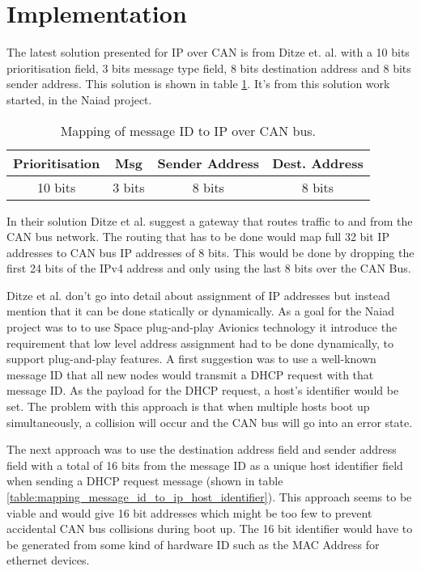 \section{Implementation}\label{sec:implementation}
The latest solution presented for IP over CAN is from Ditze et. al. with a 10
bits prioritisation field, 3 bits message type field, 8 bits destination
address and 8 bits sender address. This solution is shown in table
\ref{table:mapping_message_id_to_ip}. It's from this solution work started,
in the Naiad project.

\begin{table}[h]
\centering
    \caption{Mapping of message ID to IP over CAN bus.}
    \begin{tabular}{|c|c|c|c|} \hline
    \label{table:mapping_message_id_to_ip}
    Prioritisation & Msg & Sender Address & Dest. Address  \\ \hline
            10 bits & 3 bits & 8 bits & 8 bits \\ \hline
    \end{tabular}
\end{table}


In their solution Ditze et al. suggest a gateway that routes traffic to and from the
CAN bus network. The routing that has to be done would map full 32 bit IP
addresses to CAN bus IP addresses of 8 bits. This would be done by dropping the
first 24 bits of the IPv4 address and only using the last 8 bits over the CAN
Bus.

Ditze et al. don't go into
detail about assignment of IP addresses
but instead mention that it can be done statically or dynamically. As a goal
for the Naiad project was to to use Space plug-and-play Avionics technology
it introduce the requirement that low level address assignment had to be done
dynamically, to support plug-and-play features.
A first suggestion was to use a well-known message ID that all new
nodes would transmit a DHCP request with that message ID.
As the payload for the DHCP request, a host's identifier would be set.
The problem with this approach is that when multiple hosts boot up
simultaneously, a collision will occur and the CAN bus will go into an error
state.

The next approach was to use the destination address field and sender address field
with a total of 16 bits from the message ID as a unique host identifier field
when sending a DHCP request message (shown in table
\ref{table:mapping_message_id_to_ip_host_identifier}).
This approach seems to be viable and would
give 16 bit addresses which might be too few to prevent accidental CAN bus
collisions during boot up. The 16 bit identifier would have to be generated
from some kind of hardware ID such as the MAC Address for ethernet devices.

